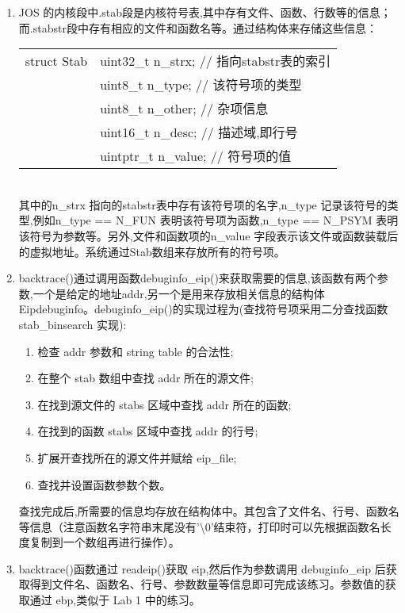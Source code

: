 \documentclass[11pt,a4paper]{article}
\begin{document}
\begin{enumerate}
\item JOS 的内核段中.stab段是内核符号表,其中存有文件、函数、行数等的信息；而.stabstr段中存有相应的文件和函数名等。通过结构体来存储这些信息：\\
\begin{tabular}{r l}
\hline 
struct Stab & uint32\_t n\_strx; // 指向stabstr表的索引 \\
& uint8\_t n\_type; // 该符号项的类型 \\
& uint8\_t n\_other; // 杂项信息 \\
& uint16\_t n\_desc; // 描述域,即行号 \\
& uintptr\_t n\_value; // 符号项的值 \\
\hline
\end{tabular}\\
其中的n\_strx 指向的stabstr表中存有该符号项的名字,n\_type 记录该符号的类型,例如n\_type == N\_FUN 表明该符号项为函数,n\_type == N\_PSYM 表明该符号为参数等。另外,文件和函数项的n\_value 字段表示该文件或函数装载后的虚拟地址。系统通过Stab数组来存放所有的符号项。\\

\item backtrace()通过调用函数debuginfo\_eip()来获取需要的信息,该函数有两个参数,一个是给定的地址addr,另一个是用来存放相关信息的结构体Eipdebuginfo。debuginfo\_eip()的实现过程为(查找符号项采用二分查找函数stab\_binsearch 实现):
\begin{enumerate}
\item 检查 addr 参数和 string table 的合法性;
\item 在整个 stab 数组中查找 addr 所在的源文件;
\item 在找到源文件的 stabs 区域中查找 addr 所在的函数;
\item 在找到的函数 stabs 区域中查找 addr 的行号;
\item 扩展开查找所在的源文件并赋给 eip\_file;
\item 查找并设置函数参数个数。
\end{enumerate}
查找完成后,所需要的信息均存放在结构体中。其包含了文件名、行号、函数名等信息（注意函数名字符串末尾没有'\textbackslash0'结束符，打印时可以先根据函数名长度复制到一个数组再进行操作）。\\
\item backtrace()函数通过 readeip()获取 eip,然后作为参数调用 debuginfo\_eip 后获取得到文件名、函数名、行号、参数数量等信息即可完成该练习。参数值的获取通过 ebp,类似于 Lab 1 中的练习。
\end{enumerate}
\end{document}
